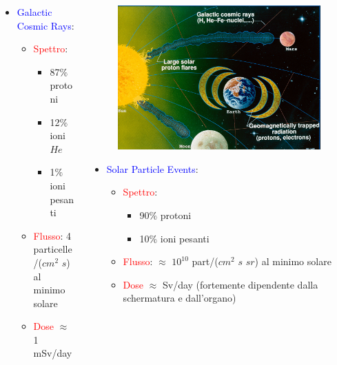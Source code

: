 \documentclass[9pt]{beamer}
\begin{document}
\begin{frame} [fragile]
\begin{columns}
\begin{column}{0.50\textwidth}
\begin{itemize}
\item \textcolor{blue}{Galactic Cosmic Rays}:
\begin{itemize}
\item \textcolor{red}{Spettro}:
\begin{itemize}
\item 87$\%$ protoni
\item 12$\%$ ioni $He$
\item 1$\%$ ioni pesanti
\end{itemize}
\item \textcolor{red}{Flusso}: 4 particelle/($cm^{2}$ $s$) al minimo solare
\item \textcolor{red}{Dose} $\approx$ 1 mSv/day 
\end{itemize}
\end{itemize}
	 \end{column}
    \begin{column}{0.50\textwidth}
   \begin{figure}
	  \centering
			\includegraphics[scale=0.80]{figures/fig4_5.jpg}
		\end{figure}   
    \begin{itemize}
\item \textcolor{blue}{Solar Particle Events}:
\begin{itemize}
\item \textcolor{red}{Spettro}:
\begin{itemize}
\item 90$\%$ protoni
\item 10$\%$ ioni pesanti
\end{itemize}
\item  \textcolor{red}{Flusso}: $\approx$ $10^{10}$ part/($cm^{2}$ $s$ $sr$) al minimo solare
\item  \textcolor{red}{Dose} $\approx$ Sv/day \newline
 (fortemente dipendente dalla schermatura e dall'organo)
\end{itemize}
\end{itemize}


\end{column}
\end{columns}
\end{frame}
\end{document}
